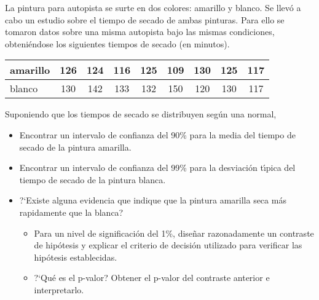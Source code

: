\begin{prob}
    La pintura para autopista se surte en dos colores: amarillo y
    blanco. Se llev\'o a cabo un estudio sobre el tiempo de secado de
    ambas pinturas. Para ello se tomaron datos sobre una misma autopista
    bajo las mismas condiciones, obteni\'endose los siguientes tiempos de
    secado (en minutos).
    \begin{center}
        \begin{tabular}{|l|cccccccc|}
            \hline
            amarillo & 126 & 124 & 116 & 125 & 109 & 130 & 125 & 117   \\
            \hline
            blanco   & 130 & 142 & 133 & 132 & 150 & 120 & 130 & 117   \\
            \hline
        \end{tabular}
    \end{center}
    Suponiendo que los tiempos de secado se distribuyen seg\'un una
    normal,
    \begin{itemize}
        \item  [a)] Encontrar un intervalo de confianza del 90\% para la
        media del tiempo de secado de la pintura amarilla.

        \item  [b)] Encontrar un intervalo de confianza del 99\% para la
        desviaci\'on t\'{\i}pica del tiempo de secado de la pintura blanca.

        \item  [c)] ?`Existe alguna evidencia que indique que la
        pintura amarilla seca m\'as rapidamente que la blanca?
        \begin{itemize}
            \item  [i)] Para un nivel de significaci\'on del 1\%,
            dise\~{n}ar razonadamente un contraste de hip\'otesis y
            explicar el criterio de decisi\'on utilizado
            para verificar las hip\'otesis establecidas.

            \item  [ii)] ?`Qu\'e es el p-valor? Obtener el p-valor del
            contraste anterior e interpretarlo.
        \end{itemize}
    \end{itemize}
\end{prob}

